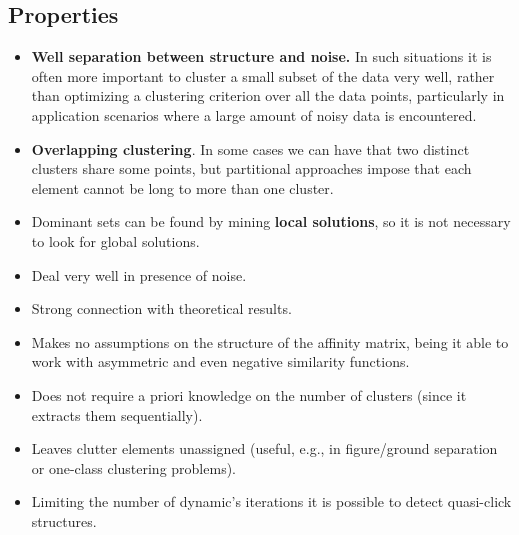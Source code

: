 \subsection{Properties}
\begin{itemize}
	\item \textbf{Well separation between structure and noise.} In such situations it is often more important to cluster a small subset of the data very well, rather than optimizing a clustering criterion over all the data points, particularly in application scenarios where a large amount of noisy data is encountered. 
	
	\item \textbf{Overlapping clustering}. In some cases we can have that two distinct clusters share some points, but partitional approaches impose that each element cannot be long to more than one cluster.
	
	\item Dominant sets can be found by mining \textbf{local solutions}, so it is not necessary to look for global solutions.
	
	\item Deal very well in presence of noise.
	
	\item Strong connection with theoretical results.
	
	\item Makes no assumptions on the structure of the affinity matrix, being it able to work with asymmetric and even negative similarity functions.
	
	\item Does not require a priori knowledge on the number of clusters (since it extracts them sequentially).
	
	\item Leaves clutter elements unassigned (useful, e.g., in figure/ground separation or one-class clustering problems).
	
	\item Limiting the number of dynamic's iterations it is possible to detect quasi-click structures.
\end{itemize}
